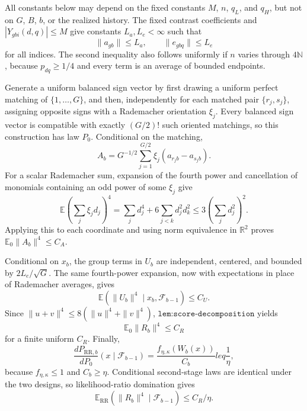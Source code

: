 All constants below may depend on the fixed constants \(M\), \(n\), \(q_L\), and \(q_H\), but not on \(G\), \(B\), \(b\), or the realized history.  The fixed contrast coefficients and \(|Y_{gbi}(d,q)|\leq M\) give constants \(L_a,L_e<\infty\) such that
\[
 \|a_{gb}\|\leq L_a,
 \qquad \|e_{gbq}\|\leq L_e
\]
for all indices.  The second inequality also follows uniformly if \(n\) varies through \(4\mathbb N\), because \(p_{dq}\geq1/4\) and every term is an average of bounded endpoints.

Generate a uniform balanced sign vector by first drawing a uniform perfect matching of \(\{1,\ldots,G\}\), and then, independently for each matched pair \(\{r_j,s_j\}\), assigning opposite signs with a Rademacher orientation \(\xi_j\).  Every balanced sign vector is compatible with exactly \((G/2)!\) such oriented matchings, so this construction has law \(P_0\).  Conditional on the matching,
\[
 A_b=G^{-1/2}\sum_{j=1}^{G/2}\xi_j(a_{r_jb}-a_{s_jb}).
\]
For a scalar Rademacher sum, expansion of the fourth power and cancellation of monomials containing an odd power of some \(\xi_j\) give
\[
 \mathbb E\left(\sum_j\xi_jd_j\right)^4
 =\sum_jd_j^4+6\sum_{j<k}d_j^2d_k^2
 \leq3\left(\sum_jd_j^2\right)^2.
\]
Applying this to each coordinate and using norm equivalence in \(\mathbb R^2\) proves \(\mathbb E_0\|A_b\|^4\leq C_A\).

Conditional on \(x_b\), the group terms in \(U_b\) are independent, centered, and bounded by \(2L_e/\sqrt G\).  The same fourth-power expansion, now with expectations in place of Rademacher averages, gives
\[
 \mathbb E(\|U_b\|^4\mid x_b,\mathcal F_{b-1})\leq C_U.
\]
Since \(\|u+v\|^4\leq8(\|u\|^4+\|v\|^4)\), \(\texttt{lem:score-decomposition}\) yields
\[
 \mathbb E_0\|R_b\|^4\leq C_R
\]
for a finite uniform \(C_R\).  Finally,
\[
 \frac{dP_{\mathrm{RR},b}}{dP_0}(x\mid\mathcal F_{b-1})
 =\frac{f_{\eta,\kappa}(W_b(x))}{C_b}leq\frac1\eta,
\]
because \(f_{\eta,\kappa}\leq1\) and \(C_b\geq\eta\).  Conditional second-stage laws are identical under the two designs, so likelihood-ratio domination gives
\[
 \mathbb E_{\mathrm{RR}}(\|R_b\|^4\mid\mathcal F_{b-1})
 \leq C_R/\eta.
\]